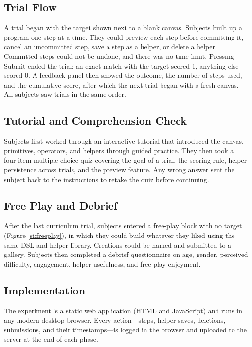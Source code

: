 \documentclass{article}
\begin{document}
\subsection{Trial Flow}
A trial began with the target shown next to a blank canvas. Subjects
built up a program one step at a time. They could preview each step
before committing it, cancel an uncommitted step, save a step as a
helper, or delete a helper. Committed steps could not be undone, and
there was no time limit. Pressing Submit ended the trial: an exact
match with the target scored 1, anything else scored 0. A feedback
panel then showed the outcome, the number of steps used, and the
cumulative score, after which the next trial began with a fresh
canvas. All subjects saw trials in the same order.

\subsection{Tutorial and Comprehension Check}
Subjects first worked through an interactive tutorial that introduced
the canvas, primitives, operators, and helpers through guided practice.
They then took a four-item multiple-choice quiz covering the goal of a
trial, the scoring rule, helper persistence across trials, and the
preview feature. Any wrong answer sent the subject back to the
instructions to retake the quiz before continuing.

\subsection{Free Play and Debrief}
After the last curriculum trial, subjects entered a free-play block
with no target (Figure \ref{si:freeplay}), in which they could build whatever they liked using the
same DSL and helper library. Creations could be named and submitted to
a gallery. Subjects then completed a debrief questionnaire on
age, gender, perceived difficulty, engagement, helper usefulness, and
free-play enjoyment.

\subsection{Implementation}
The experiment is a static web application (HTML and JavaScript) and
runs in any modern desktop browser. Every action---steps, helper
saves, deletions, submissions, and their timestamps---is logged in the
browser and uploaded to the server at the end of each phase.
\end{document}
